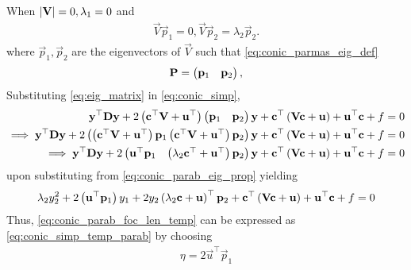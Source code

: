 \documentclass[journal,12pt,onecolumn]{IEEEtran}
\renewcommand\thesection{\arabic{section}}
\begin{document}
\begin{enumerate}[label=\thesection.\arabic*.,ref=\thesection.\theenumi]
	\subsection{}
When $\left\vert\mathbf{V}\right\vert = 0, \lambda_1 = 0$ and 
\begin{align}
\vec{V}\vec{p}_1 = 0, 
\vec{V}\vec{p}_2 = \lambda_2\vec{p}_2.
\label{eq:conic_parab_eig_prop} 
\end{align}
where $\vec{p}_1,\vec{p}_2$ are the eigenvectors of $\vec{V}$ such that  \eqref{eq:conic_parmas_eig_def}
%
\begin{align}
\mathbf{P} = \begin{pmatrix}\mathbf{p}_1 & \mathbf{p}_2\end{pmatrix},
\label{eq:eig_matrix}
\end{align}
Substituting \eqref{eq:eig_matrix}
in \eqref{eq:conic_simp},
\begin{align}
	\mathbf{y}^{\top}\mathbf{D}\mathbf{y}+2\left(\mathbf{c}^{\top}\mathbf{V}+\mathbf{u}^{\top}\right)\begin{pmatrix}\mathbf{p}_1 & \mathbf{p}_2\end{pmatrix}\mathbf{y}
	+  \mathbf{c}^{\top}\left(\mathbf{V}\mathbf{c} + \mathbf{u}\right)+ \mathbf{u}^{\top}\mathbf{c} + f&= 0
\\
\implies \mathbf{y}^{\top}\mathbf{D}\mathbf{y}
+2\begin{pmatrix}\left(\mathbf{c}^{\top}\mathbf{V}+\mathbf{u}^{\top}\right)\mathbf{p}_1  \left(\mathbf{c}^{\top}\mathbf{V}+\mathbf{u}^{\top}\right)\mathbf{p}_2\end{pmatrix}\mathbf{y}
	+  \mathbf{c}^{\top}\left(\mathbf{V}\mathbf{c} + \mathbf{u}\right)+ \mathbf{u}^{\top}\mathbf{c} + f&= 0
\\
\implies \mathbf{y}^{\top}\mathbf{D}\mathbf{y}
+2\begin{pmatrix}\mathbf{u}^{\top}\mathbf{p}_1 & \left(\lambda_2\mathbf{c}^{\top}+\mathbf{u}^{\top}\right)\mathbf{p}_2\end{pmatrix}\mathbf{y}
	+  \mathbf{c}^{\top}\left(\mathbf{V}\mathbf{c} + \mathbf{u}\right)+ \mathbf{u}^{\top}\mathbf{c} + f&= 0
\end{align}
upon substituting from 
 \eqref{eq:conic_parab_eig_prop} yielding
\begin{align}
\lambda_2y_2^2+2\left(\mathbf{u}^{\top}\mathbf{p}_1\right)y_1+  2y_2\left(\lambda_2\mathbf{c}+\mathbf{u}\right)^{\top}\mathbf{p}_2
	+  \mathbf{c}^{\top}\left(\mathbf{V}\mathbf{c} + \mathbf{u}\right)+ \mathbf{u}^{\top}\mathbf{c} + f= 0
\label{eq:conic_parab_foc_len_temp} 
\end{align}
Thus, \eqref{eq:conic_parab_foc_len_temp} 
can be expressed as \eqref{eq:conic_simp_temp_parab} by choosing
\begin{align}
\eta = 2\vec{u}^{\top}\vec{p}_1
\end{align}

\end{enumerate}
\end{document}
